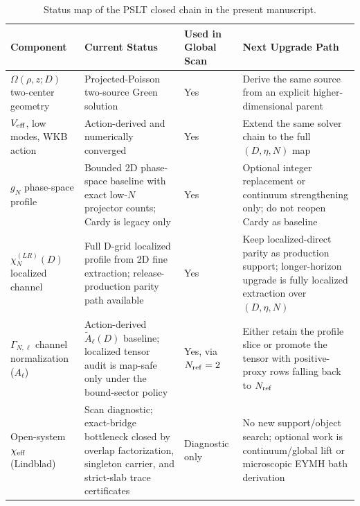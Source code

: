 \documentclass[aps,prd,onecolumn,notitlepage,nofootinbib,superscriptaddress,11pt,floatfix]{revtex4-2}
\begin{document}
\begin{table}[htbp]
\centering
\caption{Status map of the PSLT closed chain in the present manuscript.}
\label{tab:assumption_status}
\scriptsize
\setlength{\tabcolsep}{3pt}
\renewcommand{\arraystretch}{0.93}
\begin{tabular}{@{}l l l l@{}}
\toprule
\textbf{Component} & \textbf{Current Status} & \textbf{Used in Global Scan} & \textbf{Next Upgrade Path} \\
\midrule
\parbox[t]{0.17\textwidth}{$\Omega(\rho,z;D)$ two-center geometry} & \parbox[t]{0.28\textwidth}{Projected-Poisson two-source Green solution} & \parbox[t]{0.13\textwidth}{Yes} & \parbox[t]{0.24\textwidth}{Derive the same source from an explicit higher-dimensional parent} \\
\parbox[t]{0.17\textwidth}{$V_{\rm eff}$, low modes, WKB action} & \parbox[t]{0.28\textwidth}{Action-derived and numerically converged} & \parbox[t]{0.13\textwidth}{Yes} & \parbox[t]{0.24\textwidth}{Extend the same solver chain to the full $(D,\eta,N)$ map} \\
\parbox[t]{0.17\textwidth}{$g_N$ phase-space profile} & \parbox[t]{0.28\textwidth}{Bounded 2D phase-space baseline with exact low-\(N\) projector counts; Cardy is legacy only} & \parbox[t]{0.13\textwidth}{Yes} & \parbox[t]{0.24\textwidth}{Optional integer replacement or continuum strengthening only; do not reopen Cardy as baseline} \\
\parbox[t]{0.17\textwidth}{$\chi_N^{(LR)}(D)$ localized channel} & \parbox[t]{0.28\textwidth}{Full D-grid localized profile from 2D fine extraction; release-production parity path available} & \parbox[t]{0.13\textwidth}{Yes} & \parbox[t]{0.24\textwidth}{Keep localized-direct parity as production support; longer-horizon upgrade is fully localized extraction over $(D,\eta,N)$} \\
\parbox[t]{0.17\textwidth}{$\Gamma_{N,\ell}$ channel normalization ($A_\ell$)} & \parbox[t]{0.28\textwidth}{Action-derived $\tilde A_\ell(D)$ baseline; localized tensor audit is map-safe only under the bound-sector policy} & \parbox[t]{0.13\textwidth}{Yes, via $N_{\rm ref}=2$} & \parbox[t]{0.24\textwidth}{Either retain the profile slice or promote the tensor with positive-proxy rows falling back to $N_{\rm ref}$} \\
\parbox[t]{0.17\textwidth}{Open-system $\chi_{\rm eff}$ (Lindblad)} & \parbox[t]{0.28\textwidth}{Scan diagnostic; exact-bridge bottleneck closed by overlap factorization, singleton carrier, and strict-slab trace certificates} & \parbox[t]{0.13\textwidth}{Diagnostic only} & \parbox[t]{0.24\textwidth}{No new support/object search; optional work is continuum/global lift or microscopic EYMH bath derivation} \\

\end{tabular}
\end{table}
\end{document}
